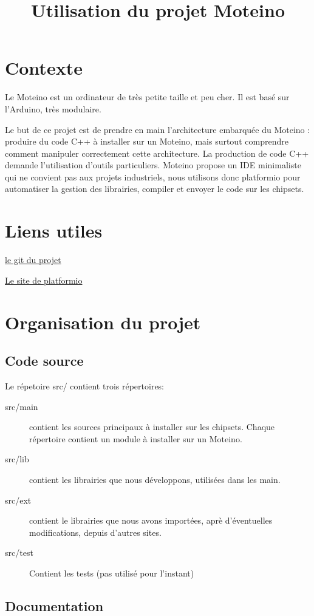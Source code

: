 \documentclass{report}
\title{Utilisation du projet Moteino}
\begin{document}
\chapter{Contexte}

Le Moteino est un ordinateur de très petite taille et peu cher. Il est basé sur l'Arduino, très modulaire. 

Le but de ce projet est de prendre en main l'architecture embarquée du Moteino : produire du code C++ à installer sur un Moteino, mais surtout comprendre comment manipuler correctement cette architecture.
La production de code C++ demande l'utilisation d'outils particuliers. Moteino propose un IDE minimaliste qui ne convient pas aux projets industriels, nous utilisons donc platformio pour automatiser la gestion des librairies, compiler et envoyer le code sur les chipsets.

\chapter{Liens utiles}

\href{https://github.com/glelouet/Moteino}{le git du projet}

\href{http://platformio.org/}{Le site de platformio}

\chapter{Organisation du projet}

\section{Code source}

Le répetoire src/ contient trois répertoires:
\begin{description}
\item[src/main] contient les sources principaux à installer sur les chipsets. Chaque répertoire contient un module à installer sur un Moteino.
\item[src/lib] contient les librairies que nous développons, utilisées dans les main.
\item[src/ext] contient le librairies que nous avons importées, aprè d'éventuelles modifications, depuis d'autres sites.
\item[src/test] Contient les tests (pas utilisé pour l'instant)
\end{description}

\section{Documentation}
\end{document}
